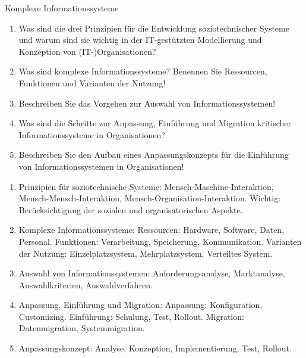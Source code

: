 \documentclass{article}
\begin{document}
\begin{exercise}{Komplexe Informationssysteme}
  \begin{enumerate}
    \item Was sind die drei Prinzipien für die Entwicklung soziotechnischer Systeme und warum sind sie wichtig in der IT-gestützten Modellierung und Konzeption von (IT-)Organisationen?
    \item Was sind komplexe Informationssysteme? Benennen Sie Ressourcen, Funktionen und Varianten der Nutzung!
    \item Beschreiben Sie das Vorgehen zur Auswahl von Informationssystemen!
    \item Was sind die Schritte zur Anpassung, Einführung und Migration kritischer Informationssysteme in Organisationen?
    \item Beschreiben Sie den Aufbau eines Anpassungskonzepts für die Einführung von Informationssystemen in Organisationen!
  \end{enumerate}

  \begin{solution}
    \begin{enumerate}
      \item Prinzipien für soziotechnische Systeme: Mensch-Maschine-Interaktion, Mensch-Mensch-Interaktion, Mensch-Organisation-Interaktion. Wichtig: Berücksichtigung der sozialen und organisatorischen Aspekte.
      \item Komplexe Informationssysteme: Ressourcen: Hardware, Software, Daten, Personal. Funktionen: Verarbeitung, Speicherung, Kommunikation. Varianten der Nutzung: Einzelplatzsystem, Mehrplatzsystem, Verteiltes System.
      \item Auswahl von Informationssystemen: Anforderungsanalyse, Marktanalyse, Auswahlkriterien, Auswahlverfahren.
      \item Anpassung, Einführung und Migration: Anpassung: Konfiguration, Customizing. Einführung: Schulung, Test, Rollout. Migration: Datenmigration, Systemmigration.
      \item Anpassungskonzept: Analyse, Konzeption, Implementierung, Test, Rollout.
    \end{enumerate}
  \end{solution}
\end{exercise}
\end{document}
